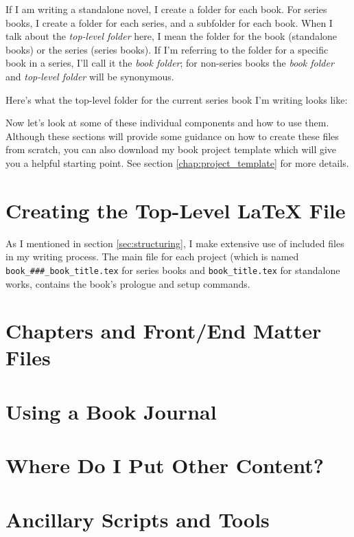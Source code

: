 If I am writing a standalone novel, I create a folder for each book. For
series books, I create a folder for each series, and a subfolder for each
book. When I talk about the \emph{top-level folder} here, I mean the folder
for the book (standalone books) or the series (series books). If I'm referring
to the folder for a specific book in a series, I'll call it the \emph{book
folder}; for non-series books the \emph{book folder} and \emph{top-level
folder} will be synonymous.

Here's what the top-level folder for the current series book I'm writing looks
like:

Now let's look at some of these individual components and how to use
them. Although these sections will provide some guidance on how to create
these files from scratch, you can also download my book project template which
will give you a helpful starting point. See section \ref{chap:project_template}
for more details.

\section{Creating the Top-Level \LaTeX{} File} \label{sec:toplevel}

As I mentioned in section \ref{sec:structuring}, I make extensive use of
included files in my writing process. The main file for each project (which is
named \texttt{book\_\#\#\#\_book\_title.tex} for series books and
\texttt{book\_title.tex} for standalone works, contains the book's prologue
and setup commands.

\section{Chapters and Front/End Matter Files} \label{sec:files}

\section{Using a Book Journal} \label{sec:journal}

\section{Where Do I Put Other Content?} \label{sec:other}

\section{Ancillary Scripts and Tools} \label{sec:ancillary}

